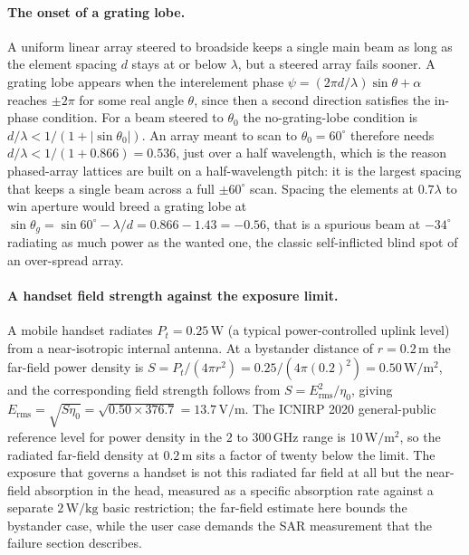 \paragraph{The onset of a grating lobe.}
A uniform linear array steered to broadside keeps a single main beam as
long as the element spacing $d$ stays at or below $\lambda$, but a
steered array fails sooner. A grating lobe appears when the
interelement phase $\psi = (2\pi d/\lambda)\sin\theta + \alpha$ reaches
$\pm 2\pi$ for some real angle $\theta$, since then a second direction
satisfies the in-phase condition. For a beam steered to $\theta_0$ the
no-grating-lobe condition is $d/\lambda < 1/(1 + |\sin\theta_0|)$. An
array meant to scan to $\theta_0 = 60^{\circ}$ therefore needs $d/
\lambda < 1/(1 + 0.866) = 0.536$, just over a half wavelength, which is
the reason phased-array lattices are built on a half-wavelength pitch:
it is the largest spacing that keeps a single beam across a full
$\pm 60^{\circ}$ scan. Spacing the elements at $0.7\lambda$ to win
aperture would breed a grating lobe at $\sin\theta_g = \sin 60^{\circ} -
\lambda/d = 0.866 - 1.43 = -0.56$, that is a spurious beam at
$-34^{\circ}$ radiating as much power as the wanted one, the classic
self-inflicted blind spot of an over-spread array.

\paragraph{A handset field strength against the exposure limit.}
A mobile handset radiates $P_t = 0.25\,\si{\watt}$ (a typical
power-controlled uplink level) from a near-isotropic internal antenna.
At a bystander distance of $r = 0.2\,\si{\meter}$ the far-field power
density is $S = P_t/(4\pi r^{2}) = 0.25/(4\pi(0.2)^{2}) = 0.50\,\si{
\watt\per\meter\squared}$, and the corresponding field strength follows
from $S = E_{\text{rms}}^{2}/\eta_0$, giving $E_{\text{rms}} =
\sqrt{S\eta_0} = \sqrt{0.50\times 376.7} = 13.7\,\si{\volt\per\meter}$.
The ICNIRP 2020 general-public reference level for power density in the
$2$ to $300\,\si{\giga\hertz}$ range is $10\,\si{\watt\per\meter
\squared}$, so the radiated far-field density at $0.2\,\si{\meter}$ sits
a factor of twenty below the limit. The exposure that governs a handset
is not this radiated far field at all but the near-field absorption in
the head, measured as a specific absorption rate against a separate
$2\,\si{\watt\per\kilogram}$ basic restriction; the far-field estimate
here bounds the bystander case, while the user case demands the SAR
measurement that the failure section describes.

